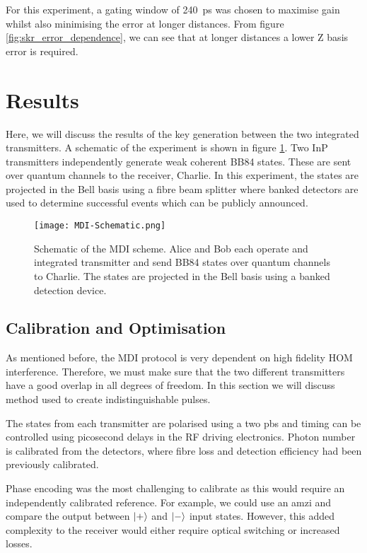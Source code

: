 For this experiment, a gating window of \SI{240}{\ps} was chosen to maximise gain whilst also minimising the error at longer distances. From figure \ref{fig:skr_error_dependence}, we can see that at longer distances a lower Z basis error is required.

\section{Results}

Here, we will discuss the results of the key generation between the two integrated transmitters. A schematic of the experiment is shown in figure \ref{fig:mdi-schem}. Two \ac{InP} transmitters independently generate weak coherent BB84 states. These are sent over quantum channels to the receiver, Charlie. In this experiment, the states are projected in the Bell basis using a fibre beam splitter where banked detectors are used to determine successful events which can be publicly announced. 

\begin{figure}[t]
	\centering
	\texttt{[image: MDI-Schematic.png]}
	\caption[Chip-based MDI-QKD experimental schematic]{Schematic of the \ac{MDI} scheme. Alice and Bob each operate and integrated transmitter and send BB84 states over quantum channels to Charlie. The states are projected in the Bell basis using a banked detection device.}
	\label{fig:mdi-schem}
\end{figure}

\subsection{Calibration and Optimisation}

As mentioned before, the \ac{MDI} protocol is very dependent on high fidelity \ac{HOM} interference. Therefore, we must make sure that the two different transmitters have a good overlap in all degrees of freedom. In this section we will discuss method used to create indistinguishable pulses.

The states from each transmitter are polarised using a two \ac{pbs} and timing can be controlled using picosecond delays in the RF driving electronics. Photon number is calibrated from the detectors, where fibre loss and detection efficiency had been previously calibrated. 

Phase encoding was the most challenging to calibrate as this would require an independently calibrated reference. For example, we could use an \ac{amzi} and compare the output between $\ket{+}$ and $\ket{-}$ input states. However, this added complexity to the receiver would either require optical switching or increased losses. 


